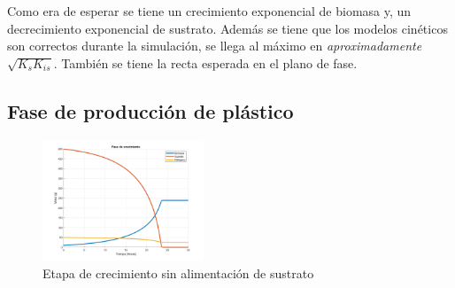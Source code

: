 \documentclass[letterpaper, 10 pt, conference]{ieeeconf}  %
\begin{document}
Como era de esperar se tiene un crecimiento exponencial de biomasa y, un decrecimiento exponencial de sustrato. Además se tiene que los modelos cinéticos son correctos durante la simulación, se llega al máximo en \textit{aproximadamente} $\sqrt{K_{s}K_{is}}$. También se tiene la recta esperada en el plano de fase.

\subsection{Fase de producción de plástico}

\begin{figure}[H]
  \centering
  \includegraphics[width=0.43\textwidth]{./Images_tp1/D0_crecimiento_completo.png}
  \caption{Etapa de crecimiento sin alimentación de sustrato}
  \label{fig:D0_whole}
\end{figure}
\end{document}

